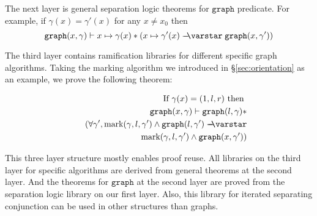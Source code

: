 The next layer is general separation logic theorems for $\mathtt{graph}$ predicate. For example, if $\gamma(x) = \gamma'(x)$ for any $x \neq x_0$ then
$$\mathtt{graph}(x, \gamma) \vdash x \mapsto \gamma(x) * (x \mapsto \gamma'(x) \wand \mathtt{graph}(x, \gamma'))$$

The third layer contains ramification libraries for different specific graph algorithms. Taking the marking algorithm we introduced in \S\ref{sec:orientation} as an example, we prove the following theorem:

\begin{eqnarray*}
&& \text{If } \gamma(x) = (1, l, r) \text{ then } \\
&& \mathtt{graph}(x, \gamma) \vdash \mathtt{graph}(l, \gamma) * \\
&& ~~ (\forall \gamma', \text{mark}(\gamma, l, \gamma') \wedge \mathtt{graph}(l, \gamma') \wand \\
&& ~~~~~~~~~~~~~~~~ \text{mark}(\gamma, l, \gamma') \wedge \mathtt{graph}(x, \gamma'))
\end{eqnarray*}

This three layer structure mostly enables proof reuse. All libraries on the third layer for specific algorithms are derived from general theorems at the second layer. And the theorems for $\mathtt{graph}$ at the second layer are proved from the separation logic library on our first layer. Also, this library for iterated separating conjunction can be used in other structures than graphs.

%

